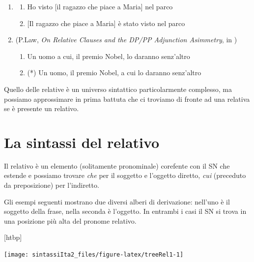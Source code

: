 \documentclass[
  a4paper,
  twoside,
  11pt,
  chapterprefix=false,
  bibliography=totocnumbered,
  listof=flat]{scrbook}
\makeatletter
\providecommand{\tightlist}{%
  \setlength{\itemsep}{0pt}\setlength{\parskip}{0pt}}
\def\fps@figure{htbp}
\renewenvironment{figure}[1][\fps@figure]{
  \edef\@tempa{\noexpand\@float{figure}[#1]} 
  \@tempa
  \sffamily
}{
  \end@float
}
\makeatother
\begin{document}
\begin{enumerate}
\def\labelenumi{(\arabic{enumi})}
\setcounter{enumi}{122}
\item
  \begin{enumerate}
  \def\labelenumii{\alph{enumii}.}
  \tightlist
  \item
    Ho visto {[}il ragazzo che piace a Maria{]} nel parco
  \item
    {[}Il ragazzo che piace a Maria{]} è stato visto nel parco
  \end{enumerate}
\item
  (P.Law, \emph{On Relative Clauses and the DP/PP Adjunction Asimmetry}, in \citep{alexiadouRelatives})

  \begin{enumerate}
  \def\labelenumii{\alph{enumii}.}
  \tightlist
  \item
    Un uomo a cui, il premio Nobel, lo daranno senz'altro
  \item
    (*) Un uomo, il premio Nobel, a cui lo daranno senz'altro
  \end{enumerate}
\end{enumerate}

Quello delle relative è un universo sintattico particolarmente complesso, ma possiamo approssimare in prima battuta che ci troviamo di fronte ad una relativa se è presente un relativo.

\hypertarget{la-sintassi-del-relativo}{%
\section{La sintassi del relativo}\label{la-sintassi-del-relativo}}

Il relativo è un elemento (solitamente pronominale) corefente con il SN che estende e possiamo trovare \emph{che} per il soggetto e l'oggetto diretto, \emph{cui} (preceduto da preposizione) per l'indiretto.

Gli esempi seguenti mostrano due diversi alberi di derivazione: nell'uno è il soggetto della frase, nella seconda è l'oggetto. In entrambi i casi il SN si trova in una posizione più alta del pronome relativo.

\begin{figure}

{\centering \texttt{[image: sintassiIta2\_files/figure-latex/treeRel1-1]} 

}

\caption{Esempio di costruzione relativa (soggetto)}\label{fig:treeRel1}
\end{figure}
\end{document}
